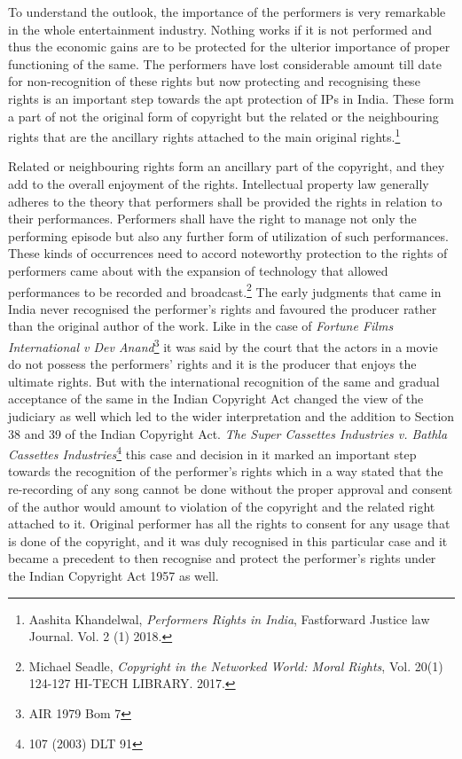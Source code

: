 \begin{multicols}{2}
\noi
To understand the outlook, the importance of the performers is very remarkable in the whole
entertainment industry. Nothing works if it is not performed and thus the economic gains are
to be protected for the ulterior importance of proper functioning of the same. The performers
have lost considerable amount till date for non-recognition of these rights but now protecting
and recognising these rights is an important step towards the apt protection of IPs in India.
These form a part of not the original form of copyright but the related or the neighbouring
rights that are the ancillary rights attached to the main original rights.\footnote{Aashita Khandelwal, \textit{Performers Rights in India}, Fastforward Justice law Journal. Vol. 2 (1) 2018.}


\noi
Related or neighbouring rights form an ancillary part of the copyright, and they add to the
overall enjoyment of the rights. Intellectual property law generally adheres to the theory that
performers shall be provided the rights in relation to their performances. Performers shall
have the right to manage not only the performing episode but also any further form of
utilization of such performances. These kinds of occurrences need to accord noteworthy
protection to the rights of performers came about with the expansion of technology that
allowed performances to be recorded and broadcast.\footnote{Michael Seadle, \textit{Copyright in the Networked World: Moral Rights}, Vol. 20(1) 124-127 HI-TECH LIBRARY.
2017.}
 The early judgments that came in India
never recognised the performer’s rights and favoured the producer rather than the original
author of the work. Like in the case of \textit{Fortune Films International v Dev Anand}\footnote{AIR 1979 Bom 7}
 it was said
by the court that the actors in a movie do not possess the performers’ rights and it is the
producer that enjoys the ultimate rights. But with the international recognition of the same
and gradual acceptance of the same in the Indian Copyright Act changed the view of the
judiciary as well which led to the wider interpretation and the addition to Section 38 and 39
of the Indian Copyright Act. \textit{The Super Cassettes Industries v. Bathla Cassettes Industries}\footnote{107 (2003) DLT 91}
this case and decision in it marked an important step towards the recognition of the
performer’s rights which in a way stated that the re-recording of any song cannot be done
without the proper approval and consent of the author would amount to violation of the
copyright and the related right attached to it. Original performer has all the rights to consent
for any usage that is done of the copyright, and it was duly recognised in this particular case
and it became a precedent to then recognise and protect the performer’s rights under the
Indian Copyright Act 1957 as well.


\end{multicols}
